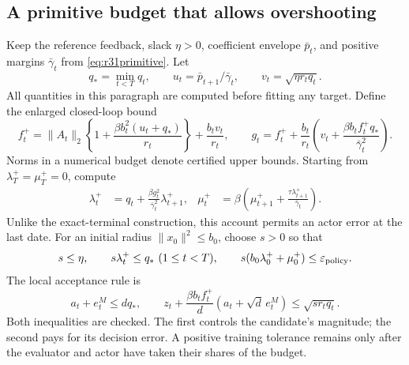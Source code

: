 \subsection{A primitive budget that allows overshooting}
Keep the reference feedback, slack $\eta>0$, coefficient envelope
$\bar p_t$, and positive margins $\bar\gamma_t$ from
\eqref{eq:r31primitive}. Let
\[
 q_* = \min_{t<T}q_t,\qquad
 u_t=\bar p_{t+1}/\bar\gamma_t,\qquad
 v_t=\sqrt{\eta r_tq_t}.
\]
All quantities in this paragraph are computed before fitting any target.
Define the enlarged closed-loop bound
\begin{equation}\label{eq:r34f}
 f_t^+=\|A_t\|_2
       \left\{1+\frac{\beta b_t^2(u_t+q_*)}{r_t}\right\}
             +\frac{b_tv_t}{r_t},
 \qquad
 g_t=f_t^++\frac{b_t}{r_t}
       \left(v_t+\frac{\beta b_tf_t^+q_*}{\bar\gamma_t^2}\right).
\end{equation}
Norms in a numerical budget denote certified upper bounds. Starting from
$\lambda_T^+=\mu_T^+=0$, compute
\begin{align}
 \lambda_t^+&=q_t+
       \frac{\beta g_t^2}{\bar\gamma_t^2}\lambda_{t+1}^+,
 &\mu_t^+&=\beta\left(\mu_{t+1}^+
             +\frac{\tau\lambda_{t+1}^+}{\bar\gamma_t}\right).
 \label{eq:r34weights}
\end{align}
Unlike the exact-terminal construction, this account permits an actor error
at the last date. For an initial radius $\|x_0\|^2\leq b_0$, choose $s>0$
so that
\begin{equation}\label{eq:r34allocation}
 s\leq\eta,\qquad s\lambda_t^+\leq q_*\ (1\leq t<T),\qquad
 s(b_0\lambda_0^++\mu_0^+)\leq\varepsilon_{\rm policy}.
\end{equation}
The local acceptance rule is
\begin{equation}\label{eq:r34accept}
 a_t+e_t^M\leq dq_*,\qquad
 z_t+\frac{\beta b_tf_t^+}{d}(a_t+\sqrt d\,e_t^M)
                         \leq\sqrt{s r_tq_t}.
\end{equation}
Both inequalities are checked. The first controls the candidate's magnitude;
the second pays for its decision error. A positive training tolerance remains
only after the evaluator and actor have taken their shares of the budget.

